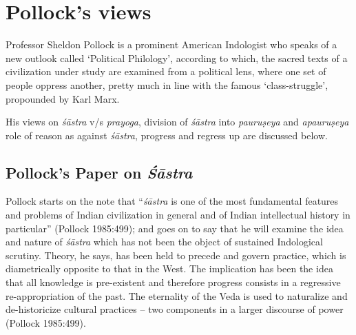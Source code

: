 \vskip -1.3cm

\section{Pollock's views}\label{art12-sec3}

Professor Sheldon Pollock is a prominent American Indologist who speaks of a new outlook called `Political Philology', according to which, the sacred texts of a civilization under study are examined from a political lens, where one set of people oppress another, pretty much in line with the famous `class-struggle', propounded by Karl Marx. 

His views on {\sl śāstra} v/s {\sl prayoga}, division of {\sl śāstra} into {\sl pauruṣeya} and {\sl apauruṣeya} role of reason as against {\sl śāstra}, progress and regress up are discussed below.



\subsection{Pollock's Paper on {{\sl\bfseries Śāstra}\relax}}\label{art12-sec3.1}

Pollock starts on the note that ``{\sl śāstra} is one of the most fundamental features and problems of Indian civilization in general and of Indian intellectual history in particular'' (Pollock 1985:499); and goes on to say that he will examine the idea and nature of {\sl śāstra} which has not been the object of sustained Indological scrutiny. Theory, he says, has been held to precede and govern practice, which is diametrically opposite to that in the West. The implication has been the idea that all knowledge is pre-existent and therefore progress consists in a regressive re-appropriation of the past. The eternality of the Veda is used to naturalize and de-historicize cultural practices -- two components in a larger discourse of power (Pollock 1985:499).

